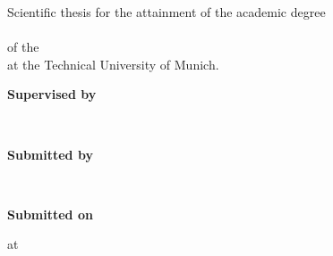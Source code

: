 \vspace*{125.2mm}
\fontsize{15pt}{17.5pt}\selectfont%
Scientific thesis for the attainment of the academic degree\\
\Grad\\
of the \Fakultaet{}\\ at the Technical University of Munich.
	
\renewcommand{\baselinestretch}{1.47}
\normalsize\selectfont
\vspace*{4.3mm}
\textbf{Supervised by}\tab
\begin{minipage}[t]{\textwidth-\CurrentLineWidth}
	\BetreutVonBetreuer\\
	\BetreutVonProf\strut
\end{minipage}
	
\textbf{Submitted by}\tab
\begin{minipage}[t]{\textwidth-\CurrentLineWidth}
	\EingereichtVon\\
	\Matrikelnummer
\end{minipage}
	
\textbf{Submitted on}\tab 
\begin{minipage}[t]{\textwidth-\CurrentLineWidth}
	\Datum{} at \Ort{}\strut
\end{minipage}

\newpage\null\thispagestyle{empty}\newpage
\newpage\null\thispagestyle{empty}\newpage

%

\pagestyle{empty}
\renewcommand*\chapterpagestyle{empty}
\tableofcontents%
\newpage\null\thispagestyle{empty}\newpage

\newpage\null\thispagestyle{empty}\newpage	
\setcounter{page}{0}
\setcounter{page}{0}
\printglossary[title={List of Abbreviations}]	
\clearpage
\newpage\null\thispagestyle{empty}\newpage	
\pagestyle{headings}
\renewcommand*\chapterpagestyle{headings}	
\setcounter{page}{1}

